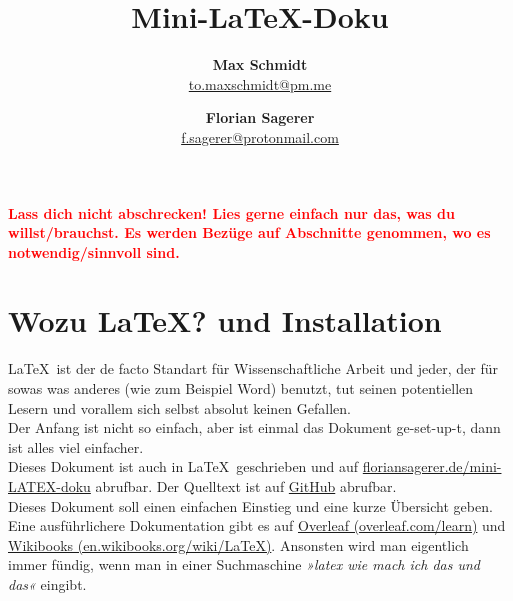 \documentclass[titlepage]{article}
\begin{document}
\title{\Huge\textbf{Mini-\LaTeX-Doku}}
\author{\textbf{Max Schmidt} \\ \href{mailto:to.maxschmidt@pm.me}{to.maxschmidt@pm.me}
   \and \textbf{Florian Sagerer} \\ \href{mailto:f.sagerer@protonmail.com}{f.sagerer@protonmail.com} }


\maketitle
\thispagestyle{empty}

\newpage
\thispagestyle{empty}
\tableofcontents

\newpage
\begin{center}
{\setlength{\parindent}{0cm}
\large{\textcolor{red}{\textbf{Lass dich nicht abschrecken! Lies gerne einfach nur das, was du willst/brauchst. Es werden Bezüge auf Abschnitte genommen, wo es notwendig/sinnvoll sind.}}}
}
\end{center}





\setcounter{page}{3}

\section{Wozu \LaTeX? und Installation}



\LaTeX\ ist der de facto Standart für Wissenschaftliche Arbeit und jeder, der für sowas was anderes (wie zum Beispiel Word) benutzt, tut seinen potentiellen Lesern und vorallem sich selbst absolut keinen Gefallen. \\
Der Anfang ist nicht so einfach, aber ist einmal das Dokument ge-set-up-t, dann ist alles viel einfacher. \\

Dieses Dokument ist auch in \LaTeX\ geschrieben und auf \href{https://floriansagerer.de/mini-LATEX-doku/}{floriansagerer.de/mini-LATEX-doku} abrufbar. 
Der Quelltext ist auf \href{https://github.com/QrxLP/mini-LATEX-doku}{GitHub} abrufbar.\\

Dieses Dokument soll einen einfachen Einstieg und eine kurze Übersicht geben.
Eine ausführlichere Dokumentation gibt es auf \href{https://www.overleaf.com/learn}{Overleaf (overleaf.com/learn)} und \href{https://en.wikibooks.org/wiki/LaTeX}{Wikibooks (en.wikibooks.org/wiki/LaTeX)}. Ansonsten wird man eigentlich immer fündig, wenn man in einer Suchmaschine \textit{»latex wie mach ich das und das«} eingibt.
\end{document}
